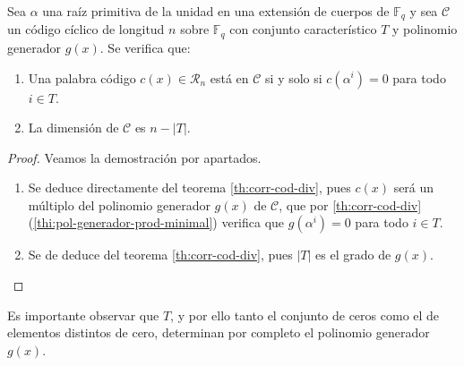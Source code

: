 \begin{theorem}
  \label{th:cicl-cto-caracteristico}
  Sea \(\alpha\) una raíz primitiva de la unidad en una extensión de cuerpos de \(\mathbb F_q\) y sea \(\mathcal C\) un código cíclico de longitud \(n\) sobre \(\mathbb F_q\) con conjunto característico \(T\) y polinomio generador \(g(x)\).
  Se verifica que: \begin{enumerate}
    \item Una palabra código \(c(x) \in \mathcal R_n\) está en \(\mathcal C\) si y solo si \(c(\alpha^i) = 0\) para todo \(i \in T\).
    \item La dimensión de \(\mathcal C\) es \(n - |T|\).
  \end{enumerate}
\end{theorem}

\begin{proof}
  Veamos la demostración por apartados.
  \begin{enumerate}
    \item Se deduce directamente del teorema \ref{th:corr-cod-div}, pues \(c(x)\) será un múltiplo del polinomio generador \(g(x)\) de \(\mathcal C\), que por \ref{th:corr-cod-div}(\ref{thi:pol-generador-prod-minimal}) verifica que \(g(\alpha^i) = 0\) para todo \(i \in T\).
    \item Se de deduce del teorema \ref{th:corr-cod-div}, pues \(|T|\) es el grado de \(g(x)\).\qedhere
  \end{enumerate}
\end{proof}

Es importante observar que \(T\), y por ello tanto el conjunto de ceros como el de elementos distintos de cero, determinan por completo el polinomio generador \(g(x)\).

